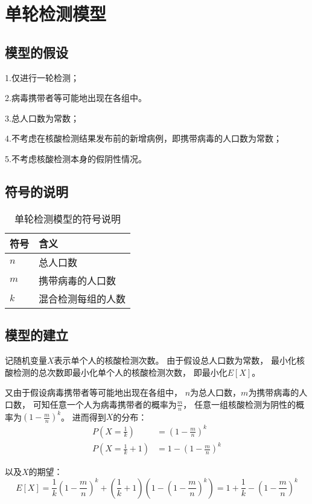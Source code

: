 \documentclass[12pt]{article}
\begin{document}
\newpage
{\centering\section{单轮检测模型}}

\subsection{模型的假设}

1.仅进行一轮检测；

2.病毒携带者等可能地出现在各组中。

3.总人口数为常数；

4.不考虑在核酸检测结果发布前的新增病例，即携带病毒的人口数为常数；

5.不考虑核酸检测本身的假阴性情况。

\subsection{符号的说明}

\begin{table}[h]
\centering
\begin{tabular}{|l|l|} 
\hline
符号 & 含义 \\
\hline
$n$ & 总人口数 \\
$m$ & 携带病毒的人口数 \\
$k$ & 混合检测每组的人数 \\
\hline
\end{tabular}
\caption{单轮检测模型的符号说明}
\end{table}

\subsection{模型的建立}

记随机变量$X$表示单个人的核酸检测次数。
由于假设总人口数为常数，
最小化核酸检测的总次数即最小化单个人的核酸检测次数，
即最小化$E[X]$。

又由于假设病毒携带者等可能地出现在各组中，
$n$为总人口数，$m$为携带病毒的人口数，
可知任意一个人为病毒携带者的概率为$\frac{m}{n}$，
任意一组核酸检测为阴性的概率为$(1 - \frac{m}{n})^k$。
进而得到$X$的分布：
\begin{align*}
P(X = \frac{1}{k}) &= (1 - \frac{m}{n})^k \\
P(X = \frac{1}{k} + 1) &= 1 - (1 - \frac{m}{n})^k
\end{align*}

以及$X$的期望：
\begin{equation*}
E[X]
= \frac{1}{k} (1 - \frac{m}{n})^k + 
(\frac{1}{k} + 1)(1 - (1 - \frac{m}{n})^k)
= 1 + \frac{1}{k} - (1 - \frac{m}{n})^k
\end{equation*}
\end{document}
